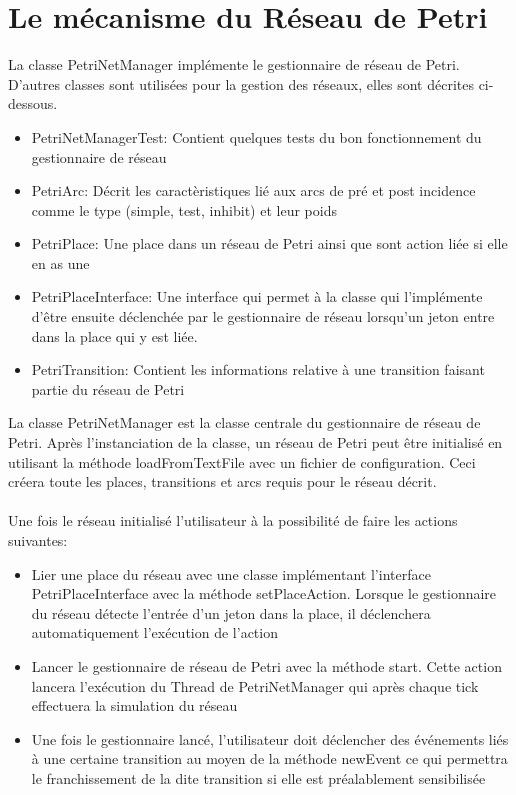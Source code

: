 \documentclass[11pt,a4paper, openany]{memoir}
\begin{document}
\chapter{Le mécanisme du Réseau de Petri}

La classe PetriNetManager implémente le gestionnaire de réseau de Petri. D'autres classes sont utilisées pour la gestion des réseaux, elles sont décrites ci-dessous.\\
\begin{itemize}
\item PetriNetManagerTest: Contient quelques tests du bon fonctionnement du gestionnaire de réseau
\item PetriArc: Décrit les caractèristiques lié aux arcs de pré et post incidence comme le type (simple, test, inhibit) et leur poids
\item PetriPlace: Une place dans un réseau de Petri ainsi que sont action liée si elle en as une
\item PetriPlaceInterface: Une interface qui permet à la classe qui l'implémente d'être ensuite déclenchée par le gestionnaire de réseau lorsqu'un jeton entre dans la place qui y est liée.
\item PetriTransition: Contient les informations relative à une transition faisant partie du réseau de Petri\\
\end{itemize}
La classe PetriNetManager est la classe centrale du gestionnaire de réseau de Petri. Après l'instanciation de la classe, un réseau de Petri peut être initialisé en utilisant la méthode loadFromTextFile avec un fichier de configuration. Ceci créera toute les places, transitions et arcs requis pour le réseau décrit.\\\\
Une fois le réseau initialisé l'utilisateur à la possibilité de faire les actions suivantes:
\begin{itemize}
\item Lier une place du réseau avec une classe implémentant l'interface PetriPlaceInterface avec la méthode setPlaceAction. Lorsque le gestionnaire du réseau détecte l'entrée d'un jeton dans la place, il déclenchera automatiquement l'exécution de l'action
\item Lancer le gestionnaire de réseau de Petri avec la méthode start. Cette action lancera l'exécution du Thread de PetriNetManager qui après chaque tick effectuera la simulation du réseau
\item Une fois le gestionnaire lancé, l'utilisateur doit déclencher des événements liés à une certaine transition au moyen de la méthode newEvent ce qui permettra le franchissement de la dite transition si elle est préalablement sensibilisée\\
\end{itemize}
\end{document}

